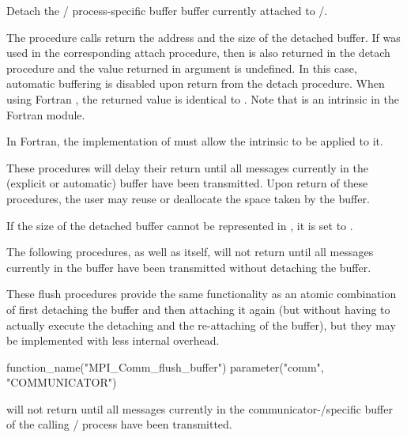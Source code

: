 Detach the \MPI/ process-specific buffer buffer currently attached to \MPI/.

The procedure calls return the
address and the size of the detached buffer.
If  was used in the corresponding attach procedure, then  is also returned in the detach procedure and the value returned in argument  is undefined.
In this case, automatic buffering is disabled upon return from the detach procedure.
When using Fortran , the returned value is identical to . Note that  is an intrinsic in the Fortran  module.
\begin{implementors}
In Fortran, the implementation of  must allow the intrinsic  to be applied to it.
\end{implementors}

These procedures
will delay their return until all messages currently in the (explicit or automatic) buffer have been transmitted.
Upon return of
these procedures, the user may reuse or deallocate the space taken by the buffer.

If the size of the detached buffer cannot be represented in
, it is set to .

\medskip %

The following  procedures, as well as  itself, will not return until all messages currently in the buffer have been transmitted without detaching the buffer.

\begin{rationale}
These flush procedures provide the same functionality as an atomic combination of first detaching the buffer and then attaching it again (but without having to actually execute the detaching and the re-attaching of the buffer), but they may be implemented with less internal overhead.
\end{rationale}

\begin{mpi-binding}
    function_name("MPI_Comm_flush_buffer")
    parameter("comm", "COMMUNICATOR")
\end{mpi-binding}

 will not return until all messages currently in the communicator\hyphen/specific buffer of the calling \MPI/ process have been transmitted.

